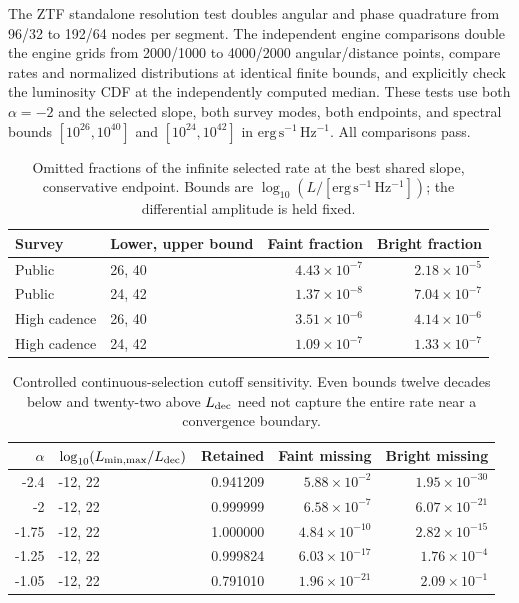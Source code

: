 The ZTF standalone resolution test doubles angular and phase quadrature from
96/32 to 192/64 nodes per segment. The independent engine comparisons double
the engine grids from 2000/1000 to 4000/2000 angular/distance points, compare
rates and normalized distributions at identical finite bounds, and explicitly
check the luminosity CDF at the independently computed median. These tests
use both $\alpha=-2$ and the selected slope, both survey modes, both endpoints,
and spectral bounds $[10^{26},10^{40}]$ and $[10^{24},10^{42}]$ in
$\mathrm{erg\,s^{-1}\,Hz^{-1}}$. All comparisons pass.
\begin{table}[H]\centering\small
\renewcommand{\arraystretch}{1.15}
\caption{Omitted fractions of the infinite selected rate at the best shared slope, conservative endpoint. Bounds are $\log_{10}(L/[\mathrm{erg\,s^{-1}\,Hz^{-1}}])$; the differential amplitude is held fixed.}
\begin{tabular}{@{}llrr@{}}
\toprule
Survey & Lower, upper bound & Faint fraction & Bright fraction \\\midrule
Public & 26, 40 & $4.43\times10^{-7}$ & $2.18\times10^{-5}$ \\
Public & 24, 42 & $1.37\times10^{-8}$ & $7.04\times10^{-7}$ \\
High cadence & 26, 40 & $3.51\times10^{-6}$ & $4.14\times10^{-6}$ \\
High cadence & 24, 42 & $1.09\times10^{-7}$ & $1.33\times10^{-7}$ \\
\bottomrule\end{tabular}\end{table}
\begin{table}[H]\centering\small
\renewcommand{\arraystretch}{1.15}
\caption{Controlled continuous-selection cutoff sensitivity. Even bounds twelve decades below and twenty-two above $L_{\rm dec}$ need not capture the entire rate near a convergence boundary.}
\begin{tabular}{@{}rlrrr@{}}
\toprule
$\alpha$ & $\log_{10}(L_{\min,\max}/L_{\rm dec})$ & Retained & Faint missing & Bright missing \\\midrule
-2.4 & -12, 22 & 0.941209 & $5.88\times10^{-2}$ & $1.95\times10^{-30}$ \\
-2 & -12, 22 & 0.999999 & $6.58\times10^{-7}$ & $6.07\times10^{-21}$ \\
-1.75 & -12, 22 & 1.000000 & $4.84\times10^{-10}$ & $2.82\times10^{-15}$ \\
-1.25 & -12, 22 & 0.999824 & $6.03\times10^{-17}$ & $1.76\times10^{-4}$ \\
-1.05 & -12, 22 & 0.791010 & $1.96\times10^{-21}$ & $2.09\times10^{-1}$ \\
\bottomrule\end{tabular}\end{table}
